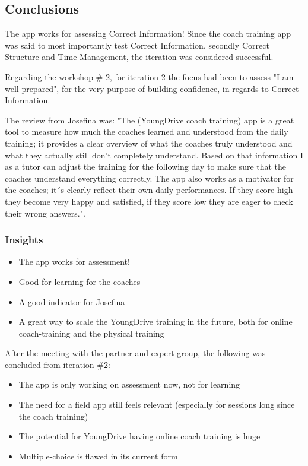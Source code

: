 \subsection{Conclusions}

The app works for assessing Correct Information! Since the coach training app was said to most importantly test Correct Information, secondly Correct Structure and Time Management, the iteration was considered successful.

Regarding the workshop \# 2, for iteration 2 the focus had been to assess "I am well prepared", for the very purpose of building confidence, in regards to Correct Information.

The review from Josefina was: "The (YoungDrive coach training) app is a great tool to measure how much the coaches learned and understood from the daily training; it provides a clear overview of what the coaches truly understood and what they actually still don’t completely understand. Based on that information I as a tutor can adjust the training for the following day to make sure that the coaches understand everything correctly. The app also works as a motivator for the coaches; it´s clearly reflect their own daily performances. If they score high they become very happy and satisfied, if they score low they are eager to check their wrong answers.".

\subsubsection{Insights}

  \begin{itemize}
    \item The app works for assessment!
    \item Good for learning for the coaches
    \item A good indicator for Josefina
    \item A great way to scale the YoungDrive training in the future, both for online coach-training and the physical training
  \end{itemize}

After the meeting with the partner and expert group, the following was concluded from iteration \#2:

\begin{itemize}
\item The app is only working on assessment now, not for learning
\item The need for a field app still feels relevant (especially for sessions long since the coach training)
\item The potential for YoungDrive having online coach training is huge
\item Multiple-choice is flawed in its current form
\end{itemize}

